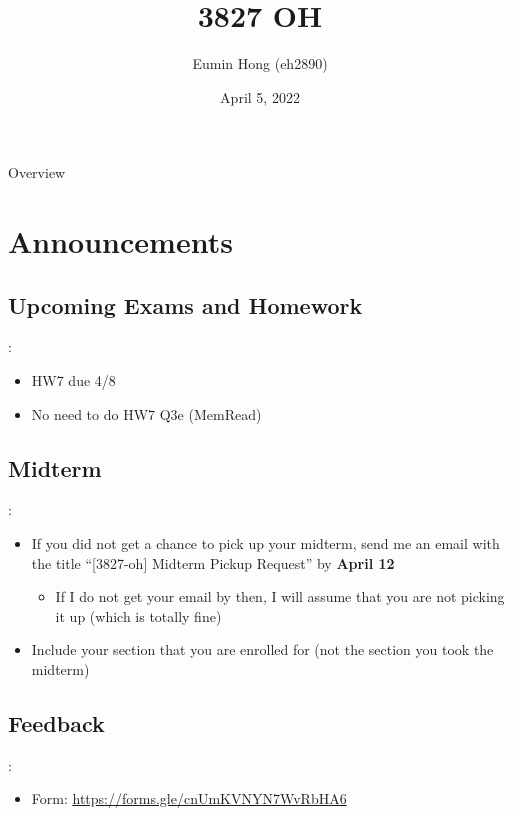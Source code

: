 \documentclass{../slides}
\title{3827 OH}
\author{Eumin Hong (eh2890)}
\institute{Columbia University}
\date{April 5, 2022}
\begin{document}
\begin{frame}
    \titlepage
\end{frame}

\begin{frame}{Overview}
\begin{multicols}{2}
\tableofcontents
\end{multicols}
\end{frame}

\section{Announcements}
\subsection{Upcoming Exams and Homework}
\begin{frame}{\secname: \subsecname}
    \begin{itemize}
        \item HW7 due 4/8
        \item No need to do HW7 Q3e (MemRead)
    \end{itemize}
\end{frame}

\subsection{Midterm}
\begin{frame}{\secname: \subsecname}
    \begin{itemize}
        \item If you did not get a chance to pick up your midterm, send me an email with the title \enquote{[3827-oh] Midterm Pickup Request} by \textbf{April 12}
        \begin{itemize}
            \item If I do not get your email by then, I will assume that you are not picking it up (which is totally fine)
        \end{itemize}
        \item Include your section that you are enrolled for (not the section you took the midterm)
    \end{itemize}
\end{frame}

\subsection{Feedback}
\begin{frame}{\secname: \subsecname}
    \begin{itemize}
        \item Form: \url{https://forms.gle/cnUmKVNYN7WvRbHA6}
    \end{itemize}
\end{frame}
\end{document}

